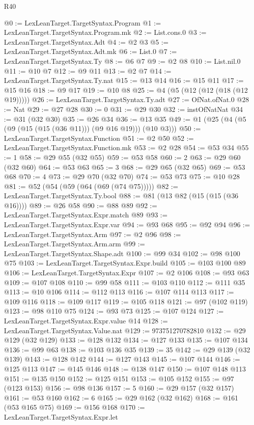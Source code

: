 \begin{lexlean}{R40}
\begin{coremodule}
@0 := LexLeanTarget.TargetSyntax.Program
@1 := LexLeanTarget.TargetSyntax.Program.mk
@2 := List.cons.{0}
@3 := LexLeanTarget.TargetSyntax.Adt
@4 := @2 @3
@5 := LexLeanTarget.TargetSyntax.Adt.mk
@6 := List.{0}
@7 := LexLeanTarget.TargetSyntax.Ty
@8 := @6 @7
@9 := @2 @8
@10 := List.nil.{0}
@11 := @10 @7
@12 := @9 @11
@13 := @2 @7
@14 := LexLeanTarget.TargetSyntax.Ty.nat
@15 := @13 @14
@16 := @15 @11
@17 := @15 @16
@18 := @9 @17
@19 := @10 @8
@25 := @4 (@5 (@12 (@12 (@18 (@12 @19)))))
@26 := LexLeanTarget.TargetSyntax.Ty.adt
@27 := OfNat.ofNat.{0}
@28 := Nat
@29 := @27 @28
@30 := 0
@31 := @29 @30
@32 := instOfNatNat
@34 := @31 (@32 @30)
@35 := @26 @34
@36 := @13 @35
@49 := @1 (@25 (@4 (@5 (@9 (@15 (@15 (@36 @11))) (@9 @16 @19))) (@10 @3)))
@50 := LexLeanTarget.TargetSyntax.Function
@51 := @2 @50
@52 := LexLeanTarget.TargetSyntax.Function.mk
@53 := @2 @28
@54 := @53 @34
@55 := 1
@58 := @29 @55 (@32 @55)
@59 := @53 @58
@60 := 2
@63 := @29 @60 (@32 @60)
@64 := @53 @63
@65 := 3
@68 := @29 @65 (@32 @65)
@69 := @53 @68
@70 := 4
@73 := @29 @70 (@32 @70)
@74 := @53 @73
@75 := @10 @28
@81 := @52 (@54 (@59 (@64 (@69 (@74 @75)))))
@82 := LexLeanTarget.TargetSyntax.Ty.bool
@88 := @81 (@13 @82 (@15 (@15 (@36 @16))))
@89 := @26 @58
@90 := @88 @89
@92 := LexLeanTarget.TargetSyntax.Expr.match @89
@93 := LexLeanTarget.TargetSyntax.Expr.var
@94 := @93 @68
@95 := @92 @94
@96 := LexLeanTarget.TargetSyntax.Arm
@97 := @2 @96
@98 := LexLeanTarget.TargetSyntax.Arm.arm
@99 := LexLeanTarget.TargetSyntax.Shape.adt
@100 := @99 @34
@102 := @98 @100 @75
@103 := LexLeanTarget.TargetSyntax.Expr.build
@105 := @103 @100 @89
@106 := LexLeanTarget.TargetSyntax.Expr
@107 := @2 @106
@108 := @93 @63
@109 := @107 @108
@110 := @99 @58
@111 := @103 @110
@112 := @111 @35
@113 := @10 @106
@114 := @112 @113
@116 := @107 @114 @113
@117 := @109 @116
@118 := @109 @117
@119 := @105 @118
@121 := @97 (@102 @119)
@123 := @98 @110 @75
@124 := @93 @73
@125 := @107 @124
@127 := LexLeanTarget.TargetSyntax.Expr.value @14
@128 := LexLeanTarget.TargetSyntax.Value.nat
@129 := 973751270782810
@132 := @29 @129 (@32 @129)
@133 := @128 @132
@134 := @127 @133
@135 := @107 @134
@136 := @99 @63
@138 := @103 @136 @35
@139 := 35
@142 := @29 @139 (@32 @139)
@143 := @128 @142
@144 := @127 @143
@145 := @107 @144
@146 := @125 @113
@147 := @145 @146
@148 := @138 @147
@150 := @107 @148 @113
@151 := @135 @150
@152 := @125 @151
@153 := @105 @152
@155 := @97 (@123 @153)
@156 := @98 @136
@157 := 5
@160 := @29 @157 (@32 @157)
@161 := @53 @160
@162 := 6
@165 := @29 @162 (@32 @162)
@168 := @161 (@53 @165 @75)
@169 := @156 @168
@170 := LexLeanTarget.TargetSyntax.Expr.let

\end{coremodule}
\end{lexlean}
